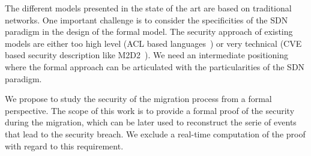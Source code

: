 The different models presented in the state of the art are based on traditional networks.
One important challenge is to consider the specificities of the SDN paradigm in the design of the formal model.
The security approach of existing models are either too high level (ACL based languages~\cite{orbac,mulval-Ou2013}) or very technical (CVE based security description like M2D2~\cite{M2D2-Morin2002}).
We need an intermediate positioning where the formal approach can be articulated with the particularities of the SDN paradigm.

We propose to study the security of the migration process from a formal perspective.
The scope of this work is to provide a formal proof of the security during the migration, which can be later used to reconstruct the serie of events that lead to the security breach. We exclude a real-time computation of the proof with regard to this requirement.
